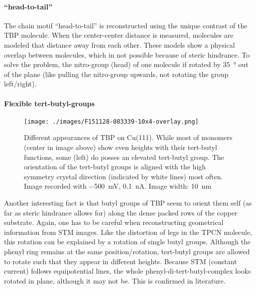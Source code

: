 \paragraph{``head-to-tail''}
The chain motif ``head-to-tail'' is reconstructed using the unique contrast of the TBP molecule. When the center-center distance is measured, molecules are modeled that distance away from each other. These models show a physical overlap between molecules, which in not possible because of steric hindrance. To solve the problem, the nitro-group (head) of one molecule if rotated by \SI{35}{\degree} out of the plane (like pulling the nitro-group upwards, not rotating the group left/right). 


\paragraph{Flexible tert-butyl-groups}
\begin{figure}\centering
	\texttt{[image: ./images/F151128-083339-10x4-overlay.png]}
	\caption{Different appearances of TBP on Cu(111). While most of monomers (center in image above) show even heights with their tert-butyl functions, some (left) do posses an elevated tert-butyl group. The orientation of the tert-butyl groups is aligned with the high symmetry crystal direction (indicated by white lines) most often. Image recorded with  \SI{-500}{\milli\volt}, \SI{0.1}{\nano\ampere}. Image width: \SI{10}{\nano \meter}}
	\label{fig:TPB-butyl-flexibility-SMT}
\end{figure}

Another interesting fact is that butyl groups of TBP seem to orient them self (as far as steric hindrance allows for) along the dense packed rows of the copper substrate. Again, one has to be careful when reconstructing geometrical information from STM images. Like the distortion of legs in the TPCN molecule, this rotation can be explained by a rotation of single butyl groups. Although the phenyl ring remains at the same position/rotation, tert-butyl groups are allowed to rotate such that they appear in different heights. Because STM (constant current) follows equipotential lines, the whole phenyl-di-tert-butyl-complex looks rotated in plane, although it may not be. This is confirmed in literature\cite{heim_surface-assisted_2010, heim_self-assembly_2010}.

